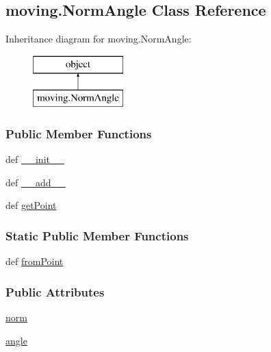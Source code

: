 \hypertarget{classmoving_1_1NormAngle}{\subsection{moving.\-Norm\-Angle Class Reference}
\label{classmoving_1_1NormAngle}
}
Inheritance diagram for moving.\-Norm\-Angle\-:\begin{figure}[H]
\begin{center}
\leavevmode
\includegraphics[height=2.000000cm]{classmoving_1_1NormAngle}
\end{center}
\end{figure}
\subsubsection*{Public Member Functions}
\begin{DoxyCompactItemize}
\item 
def \hyperlink{classmoving_1_1NormAngle_a12d558d559a2dfd98725ba14e88678f8}{\-\_\-\-\_\-init\-\_\-\-\_\-}
\item 
def \hyperlink{classmoving_1_1NormAngle_ae02427390608a55ed603a45f530713cf}{\-\_\-\-\_\-add\-\_\-\-\_\-}
\item 
def \hyperlink{classmoving_1_1NormAngle_a974791421e05b5df0a1a7b7932561a4e}{get\-Point}
\end{DoxyCompactItemize}
\subsubsection*{Static Public Member Functions}
\begin{DoxyCompactItemize}
\item 
def \hyperlink{classmoving_1_1NormAngle_a32cec3b7beb598f4c41c8f540b636b75}{from\-Point}
\end{DoxyCompactItemize}
\subsubsection*{Public Attributes}
\begin{DoxyCompactItemize}
\item 
\hyperlink{classmoving_1_1NormAngle_aa1c83abb2f11a937badd1bb77efc5c87}{norm}
\item 
\hyperlink{classmoving_1_1NormAngle_a1849471fc66f5facf2380870819359f5}{angle}
\end{DoxyCompactItemize}


